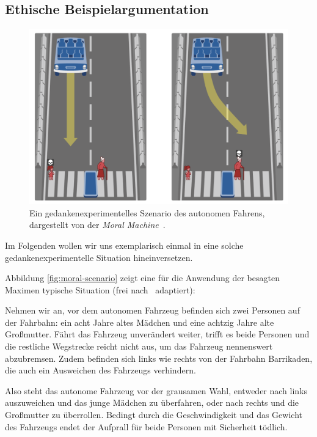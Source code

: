 \documentclass[twocolumn, german]{tum-article}
\begin{document}
\subsection{Ethische Beispielargumentation}
\label{sec:situation}
\begin{figure}
	\includegraphics[width=\linewidth]{media/moral-scenario}
	\caption{Ein gedankenexperimentelles Szenario des autonomen Fahrens, dargestellt von der \emph{Moral Machine}~\cite{moral-machine-web}.}
	\label{fig:moral-scenario}
\end{figure}

Im Folgenden wollen wir uns exemplarisch einmal in eine solche gedankenexperimentelle Situation hineinversetzen.

Abbildung \vref{fig:moral-scenario} zeigt eine für die Anwendung der besagten Maximen typische Situation (frei nach~\cite[S. 69f.]{maurer-autonomous} adaptiert):

Nehmen wir an, vor dem autonomen Fahrzeug befinden sich zwei Personen auf der Fahrbahn: ein acht Jahre altes Mädchen und eine achtzig Jahre alte Großmutter.
Fährt das Fahrzeug unverändert weiter, trifft es beide Personen und die restliche Wegstrecke reicht nicht aus, um das Fahrzeug nennenswert abzubremsen.
Zudem befinden sich links wie rechts von der Fahrbahn Barrikaden, die auch ein Ausweichen des Fahrzeugs verhindern.

Also steht das autonome Fahrzeug vor der grausamen Wahl, entweder nach links auszuweichen und das junge Mädchen zu überfahren, oder nach rechts und die Großmutter zu überrollen.
Bedingt durch die Geschwindigkeit und das Gewicht des Fahrzeugs endet der Aufprall für beide Personen mit Sicherheit tödlich.
\end{document}
